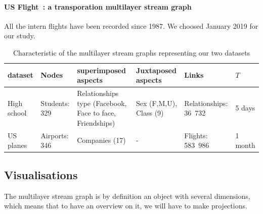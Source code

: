 \documentclass{svproc}
\begin{document}
\paragraph{US Flight~\cite{planes}: a transporation multilayer stream graph} All the intern flights have been recorded since 1987. We choosed January 2019 for our study. 

\begin{table}
\begin{tabularx}{\linewidth}{|l|l|X|X|X|l|}
\hline
dataset & Nodes & superimposed aspects  & Juxtaposed aspects & Links & $T$ \\
\hline
High school & Students: 329&  Relationships type (Facebook, Face to face, Friendships) & Sex (F,M,U), Class (9)&  Relationships: 36~732 & 5 days \\
\hline
US planes & Airports: 346 & Companies (17) & - & Flights: 583~986 & 1 month \\
\hline
\end{tabularx}
\caption{Characteristic of the multilayer stream graphs representing our two datasets}
\label{tab:characteristics}
\end{table}


\subsection{Visualisations}
The multilayer stream graph is by definition an object with several dimensions, which means that to have an overview on it, we will have to make projections.
\end{document}
